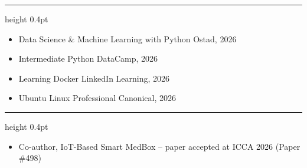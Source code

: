 \documentclass[10pt,letterpaper]{article}
\newcommand{\sect}[1]{\par\vspace{6pt}{\large\bfseries #1}\par\vspace{1pt}\hrule height 0.4pt\vspace{3pt}}
\begin{document}
\sect{CERTIFICATIONS}
\begin{itemize}
  \item Data Science \& Machine Learning with Python \hfill Ostad, 2026
  \item Intermediate Python \hfill DataCamp, 2026
  \item Learning Docker \hfill LinkedIn Learning, 2026
  \item Ubuntu Linux Professional \hfill Canonical, 2026
\end{itemize}

\sect{ACHIEVEMENTS}
\begin{itemize}
  \item Co-author, IoT-Based Smart MedBox -- paper accepted at ICCA 2026 (Paper \#498)
\end{itemize}
\end{document}

